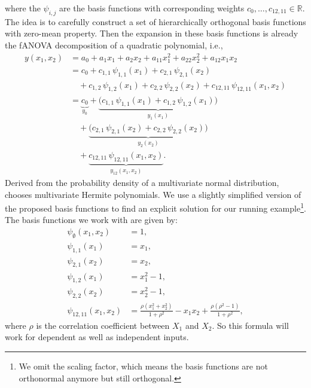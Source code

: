 where the $\psi_{i,j}$ are the basis functions with corresponding weights 
$c_0, \dots , c_{12,11} \in \mathbb{R}$.
The idea is to carefully construct a set of hierarchically orthogonal basis functions with zero-mean property. Then the expansion in these basis functions is already the 
fANOVA decomposition of a quadratic polynomial, i.e.,
\begin{align*}
y(x_1,x_2) 
&= a_0 + a_1 x_1 + a_2 x_2 
   + a_{11} x_1^2 + a_{22} x_2^2 + a_{12} x_1 x_2 \\[0.5em]
&= c_0 
   + c_{1,1}\,\psi_{1,1}(x_1) 
   + c_{2,1}\,\psi_{2,1}(x_2) \\[0.5em]
&\quad
   + c_{1,2}\,\psi_{1,2}(x_1)
   + c_{2,2}\,\psi_{2,2}(x_2)
   + c_{12,11}\,\psi_{12,11}(x_1,x_2) \\[0.5em]
&= 
   \underbrace{c_0}_{y_0}
   + \underbrace{\big(c_{1,1}\,\psi_{1,1}(x_1) 
                     + c_{1,2}\,\psi_{1,2}(x_1)\big)}_{y_1(x_1)} \\[0.5em]
&\quad
   + \underbrace{\big(c_{2,1}\,\psi_{2,1}(x_2) 
                     + c_{2,2}\,\psi_{2,2}(x_2)\big)}_{y_2(x_2)} \\[0.5em]
&\quad
   + \underbrace{c_{12,11}\,\psi_{12,11}(x_1,x_2)}_{y_{12}(x_1,x_2)}.
\end{align*}
Derived from the probability density of a multivariate normal distribution, \cite{rahman2014} chooses multivariate Hermite polynomials. We use a slightly simplified version of the proposed basis functions to find an explicit solution for our running example\footnote{We omit the scaling factor, which means the basis functions are not orthonormal anymore but still orthogonal.}. The basis functions we work with are given by:
\[
\begin{aligned}
\psi_{\emptyset}(x_1,x_2) &= 1, \\[0.5em]
\psi_{1,1}(x_1) &= x_1, \\[0.5em]
\psi_{2,1}(x_2) &= x_2, \\[0.5em]
\psi_{1,2}(x_1) &= x_1^2 - 1, \\[0.5em]
\psi_{2,2}(x_2) &= x_2^2 - 1, \\[0.5em]
\psi_{12,11}(x_1,x_2) &= \frac{\rho (x_1^2 + x_2^2)}{1 + \rho^2} 
                         - x_1 x_2 
                         + \frac{\rho(\rho^2 - 1)}{1 + \rho^2},
\end{aligned}
\]
where $\rho$ is the correlation coefficient between $X_1$ and $X_2$. So this formula will work for dependent as well as independent inputs.\par
